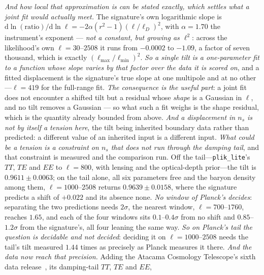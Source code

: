 \documentclass[11pt,a4paper]{article}
\theoremstyle{plain}
\theoremstyle{definition}
\theoremstyle{remark}
\newcommand{\dd}{\mathrm{d}}   %
\begin{document}
\emph{And how local that approximation is can be stated exactly, which settles what a joint fit would
actually meet.} The signature's own logarithmic slope is
$\dd\ln(\text{ratio})/\dd\ln\ell=-2\alpha(r^{2}-1)(\ell/\ell_{D})^{2}$, with $\alpha=1.70$ the instrument's
exponent --- \emph{not a constant, but growing as
$\ell^{2}$}: across the likelihood's own $\ell=30$--$2508$ it runs from $-0.0002$ to $-1.09$, a factor of
seven thousand, which is exactly
$(\ell_{\max}/\ell_{\min})^{2}$. \emph{So a single tilt is a
one-parameter fit to a function whose slope varies by that factor over the data it is scored on}, and a
fitted displacement is the signature's true slope at one multipole and at no other---$\ell=419$ for the
full-range fit.
\emph{The consequence is the useful part}: a joint fit does not encounter a shifted tilt but a residual
whose \emph{shape} is a Gaussian in $\ell$, and no tilt removes a Gaussian --- so what such a fit weighs
is the shape residual, which is the quantity already bounded from above. \emph{And a displacement in
$n_s$ is not by itself a tension here}, the tilt being inherited boundary data rather than predicted: a
different value of an inherited input is a different input. \emph{What could be a tension is a constraint
on $n_s$ that does not run through the damping tail}, and that constraint is measured and the comparison
run. Off the tail---\texttt{plik\_lite}'s $TT$, $TE$ and $EE$ to $\ell=800$, with lensing and the
optical-depth prior---the tilt is $0.9611\pm0.0063$; on the tail alone, all six parameters free and the
baryon density among them, $\ell=1000$--$2508$ returns $0.9639\pm0.0158$, where the signature predicts a
shift of $+0.022$ and its absence none. \emph{No window of Planck's decides}: separating the two predictions
needs $2\sigma$, the nearest window, $\ell=700$--$1760$, reaches $1.65$, and each of the four windows sits
$0.1$--$0.4\sigma$ from no shift and $0.85$--$1.2\sigma$ from the signature's, all four leaning the same
way. \emph{So on Planck's
tail the question is decidable and not decided}: deciding it on $\ell=1000$--$2508$ needs the tail's tilt
measured $1.44$ times as precisely as Planck measures it there. \emph{And the data now reach that precision.}
Adding the Atacama Cosmology Telescope's sixth data release~\cite{ACTDR6}, its damping-tail $TT$, $TE$ and $EE$,
\end{document}
